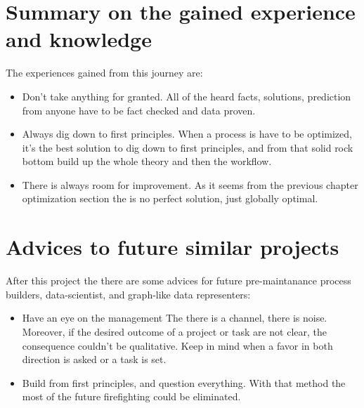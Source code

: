 \section{Summary on the gained experience and knowledge}
The experiences gained from this journey are:
\begin{itemize}
	\item{Don't take anything for granted.} All of the heard facts, solutions, prediction from anyone have to be fact checked and data proven.
	\item{Always dig down to first principles.} When a process is have to be optimized, it's the best solution to dig down to first principles, and from that solid rock bottom build up the whole theory and then the workflow.
	\item{There is always room for improvement.} As it seems from the previous chapter optimization section the is no perfect solution, just globally optimal. 
\end{itemize}
\section{Advices to future similar projects}
After this project the there are some advices for future pre-maintanance process builders, data-scientist, and graph-like data representers:
\begin{itemize}
	\item{Have an eye on the management} The there is a channel, there is noise. Moreover, if the desired outcome of a project or task are not clear, the consequence couldn't be qualitative. Keep in mind when a favor in both direction is asked or a task is set.
	\item{Build from first principles, and question everything.} With that method the most of the future firefighting could be eliminated.
\end{itemize}